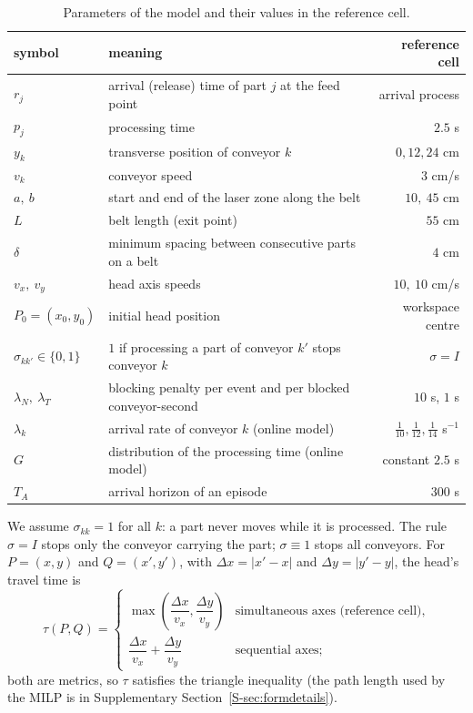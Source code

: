 \documentclass[11pt,a4paper]{article}
\theoremstyle{plain}
\theoremstyle{definition}
\theoremstyle{remark}
\newcommand{\Supp}[1]{Supplementary Section~\ref{S-#1}}
\begin{document}
\begin{table}[t]
\centering\small
\caption{Parameters of the model and their values in the reference cell.}
\label{tab:params}
\begin{tabularx}{\linewidth}{@{}l X r@{}}
\toprule
symbol & meaning & reference cell\\
\midrule
$r_j$ & arrival (release) time of part $j$ at the feed point & arrival process\\
$p_j$ & processing time & $2.5$ s\\
$y_k$ & transverse position of conveyor $k$ & $0,12,24$ cm\\
$v_k$ & conveyor speed & $3$ cm/s\\
$a,\ b$ & start and end of the laser zone along the belt & $10,\ 45$ cm\\
$L$ & belt length (exit point) & $55$ cm\\
$\delta$ & minimum spacing between consecutive parts on a belt & $4$ cm\\
$v_x,\ v_y$ & head axis speeds & $10,\ 10$ cm/s\\
$P_0=(x_0,y_0)$ & initial head position & workspace centre\\
$\sigma_{kk'}\in\{0,1\}$ & $1$ if processing a part of conveyor $k'$ stops conveyor $k$ & $\sigma=I$\\
$\lambda_N,\ \lambda_T$ & blocking penalty per event and per blocked conveyor-second & $10$ s, $1$ s\\
$\lambda_k$ & arrival rate of conveyor $k$ (online model) & $\tfrac1{10},\tfrac1{12},\tfrac1{14}$ s$^{-1}$\\
$G$ & distribution of the processing time (online model) & constant $2.5$ s\\
$T_A$ & arrival horizon of an episode & $300$ s\\
\bottomrule
\end{tabularx}
\end{table}

We assume $\sigma_{kk}=1$ for all $k$: a part never moves while it is processed. The rule
$\sigma=I$ stops only the conveyor carrying the part; $\sigma\equiv1$ stops all conveyors.
For $P=(x,y)$ and $Q=(x',y')$, with $\Delta x=|x'-x|$ and $\Delta y=|y'-y|$, the head's
travel time is
\begin{equation}\label{eq:tau}
\tau(P,Q)=
\begin{cases}
\max\!\left(\dfrac{\Delta x}{v_x},\dfrac{\Delta y}{v_y}\right) & \text{simultaneous axes (reference cell)},\\[1.5ex]
\dfrac{\Delta x}{v_x}+\dfrac{\Delta y}{v_y} & \text{sequential axes;}
\end{cases}
\end{equation}
both are metrics, so $\tau$ satisfies the triangle inequality (the path length used by the
MILP is in \Supp{sec:formdetails}).
\end{document}
